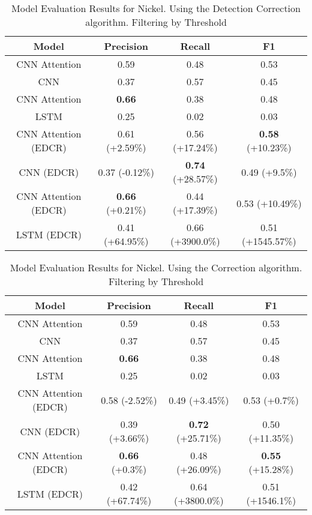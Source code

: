\begin{table}
\centering
\begin{tabular}{|c|c|c|c|}
\hline
Model & Precision & Recall & F1\\
\hline
CNN Attention & 0.59 & 0.48 & 0.53\\
CNN  & 0.37 & 0.57 & 0.45\\
CNN Attention & \textbf{0.66} & 0.38 & 0.48\\
LSTM  & 0.25 & 0.02 & 0.03\\

\hline
CNN Attention (EDCR) & 0.61 (+2.59\%) & 0.56 (+17.24\%) & \textbf{0.58} (+10.23\%)\\
CNN  (EDCR) & 0.37 (-0.12\%) & \textbf{0.74} (+28.57\%) & 0.49 (+9.5\%)\\
CNN Attention (EDCR) & \textbf{0.66} (+0.21\%) & 0.44 (+17.39\%) & 0.53 (+10.49\%)\\
LSTM  (EDCR) & 0.41 (+64.95\%) & 0.66 (+3900.0\%) & 0.51 (+1545.57\%)\\

\hline
\end{tabular}
\caption{Model Evaluation Results for Nickel. Using the Detection Correction algorithm. Filtering by Threshold}
\end{table}
\begin{table}
\centering
\begin{tabular}{|c|c|c|c|}
\hline
Model & Precision & Recall & F1\\
\hline
CNN Attention & 0.59 & 0.48 & 0.53\\
CNN  & 0.37 & 0.57 & 0.45\\
CNN Attention & \textbf{0.66} & 0.38 & 0.48\\
LSTM  & 0.25 & 0.02 & 0.03\\

\hline
CNN Attention (EDCR) & 0.58 (-2.52\%) & 0.49 (+3.45\%) & 0.53 (+0.7\%)\\
CNN  (EDCR) & 0.39 (+3.66\%) & \textbf{0.72} (+25.71\%) & 0.50 (+11.35\%)\\
CNN Attention (EDCR) & \textbf{0.66} (+0.3\%) & 0.48 (+26.09\%) & \textbf{0.55} (+15.28\%)\\
LSTM  (EDCR) & 0.42 (+67.74\%) & 0.64 (+3800.0\%) & 0.51 (+1546.1\%)\\

\hline
\end{tabular}
\caption{Model Evaluation Results for Nickel. Using the Correction algorithm. Filtering by Threshold}
\end{table}
